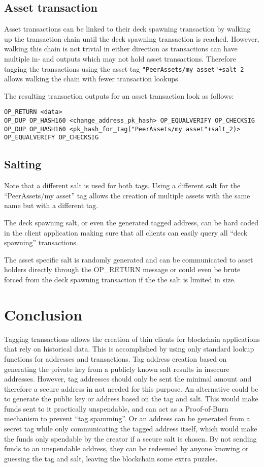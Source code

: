 \documentclass[a4paper,10pt]{article}
\begin{document}
\subsection{Asset transaction}
Asset transactions can be linked to their deck spawning transaction by walking up the transaction chain until the deck spawning transaction is reached.
However, walking this chain is not trivial in either direction as transactions can have multiple in- and outputs which may not hold asset transactions.
Therefore tagging the transactions using the asset tag \verb|"PeerAssets/my asset"+salt_2| allows walking the chain with fewer transaction lookups.

The resulting transaction outputs for an asset transaction look as follows:
\begin{scriptsize}\begin{verbatim}
OP_RETURN <data>
OP_DUP OP_HASH160 <change_address_pk_hash> OP_EQUALVERIFY OP_CHECKSIG
OP_DUP OP_HASH160 <pk_hash_for_tag("PeerAssets/my asset"+salt_2)> OP_EQUALVERIFY OP_CHECKSIG
\end{verbatim}\end{scriptsize}

\subsection{Salting}
Note that a different salt is used for both tags.
Using a different salt for the ``PeerAssets/my asset'' tag allows the creation of multiple assets with the same name but with a different tag.

The deck spawning salt, or even the generated tagged address, can be hard coded in the client application making sure that all clients can easily query all ``deck spawning'' transactions.

The asset specific salt is randomly generated and can be communicated to asset holders directly through the OP\_RETURN message or could even be brute forced from the deck spawning transaction if the the salt is limited in size.


\section{Conclusion}
Tagging transactions allows the creation of thin clients for blockchain applications that rely on historical data.
This is accomplished by using only standard lookup functions for addresses and transactions.
Tag address creation based on generating the private key from a publicly known salt results in insecure addresses.
However, tag addresses should only be sent the minimal amount and therefore a secure address in not needed for this purpose.
An alternative could be to generate the public key or address based on the tag and salt. This would make funds sent to it practically unspendable, and can act as a Proof-of-Burn mechanism to prevent ``tag spamming''.
Or an address can be generated from a secret tag while only communicating the tagged address itself, which would make the funds only spendable by the creator if a secure salt is chosen.
By not sending funds to an unspendable address, they can be redeemed by anyone knowing or guessing the tag and salt, leaving the blockchain some extra puzzles.
\end{document}
